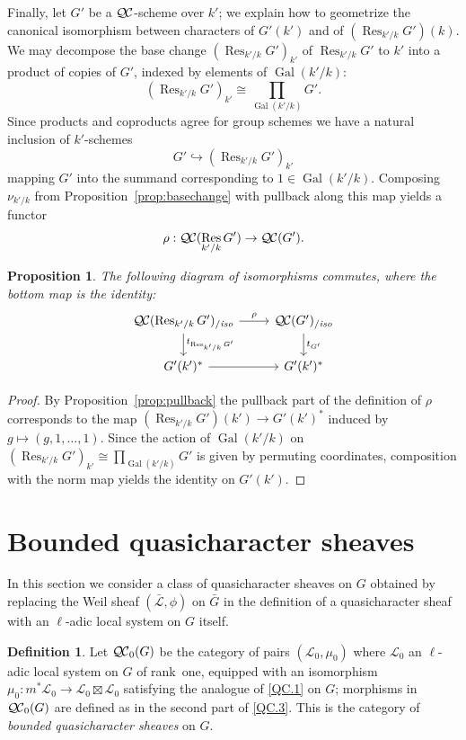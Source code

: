 \documentclass[11pt]{amsart}
\theoremstyle{plain}
\newtheorem{proposition}[theorem]{Proposition}
\theoremstyle{definition}
\newtheorem{definition}[theorem]{Definition}
\theoremstyle{remark}
\DeclareMathOperator{\Gal}{Gal}
\DeclareMathOperator{\Res}{Res}
\newcommand{\qcs}[1]{{\mathcal{#1}}}
\newcommand{\gqcs}[1]{{\mathcal{\bar #1}}}
\newcommand{\QC}{{\mathcal{Q\hskip-0.8pt C}}}
\newcommand{\QCb}{{\QC_0}}
\newcommand{\QCiso}[1]{\QC(#1)_{/\textit{iso}}}
\newcommand{\trFrob}[1]{t_{#1}}
\newcommand{\bG}{\bar{G}}
\begin{document}
Finally, let $G'$ be a $\QC$-scheme over $k'$;
we explain how to geometrize the canonical isomorphism between characters of $G'(k')$ and of $(\Res_{k'/k}G')(k)$.
We may decompose the base change $(\Res_{k'/k}G')_{k'}$ of $\Res_{k'/k}G'$ to $k'$
into a product of copies of $G'$, indexed by elements of $\Gal(k'/k)$:
\[
(\Res_{k'/k}G')_{k'} \cong \prod_{\Gal(k'/k)} G'.
\]
Since products and coproducts agree for group schemes we have a natural inclusion of $k'$-schemes 
\[
G' \hookrightarrow (\Res_{k'/k}G')_{k'}
\]
mapping $G'$ into the summand corresponding to $1 \in \Gal(k'/k)$.  Composing $\nu_{k'/k}$ 
from Proposition~\ref{prop:basechange} with pullback along this map yields a functor
\[
\rho : \QC(\Res_{k'/k}G') \to \QC(G').
\]

\begin{proposition}
The following diagram of isomorphisms commutes, where the bottom map is the identity:
\[
\begin{tikzcd}
\QCiso{\Res_{k'/k} G'} \dar{\trFrob{\Res_{k'/k} G'}} \rar{\rho} & \QCiso{G'} \dar{\trFrob{G'}}\\
G'(k')^* \rar & G'(k')^*
\end{tikzcd}
\]
\end{proposition}
\begin{proof}
By Proposition~\ref{prop:pullback} the pullback part of the definition of $\rho$ corresponds to the map $(\Res_{k'/k}G')(k') \to G'(k')^*$
induced by $g \mapsto (g, 1, \ldots, 1)$.  Since the action of $\Gal(k'/k)$ on $(\Res_{k'/k}G')_{k'} \cong \prod_{\Gal(k'/k)} G'$
is given by permuting coordinates, composition with the norm map yields the identity on $G'(k')$.
\end{proof}

\section{Bounded quasicharacter sheaves}\label{sec:bounded}

In this section we consider a class of quasicharacter sheaves on $G$ obtained by
replacing the Weil sheaf $(\gqcs{L}, \phi)$ on $\bG$ in the definition of a quasicharacter
sheaf with an $\ell$-adic local system on $G$ itself.

\begin{definition}
Let $\QCb(G)$ be the category of pairs $(\qcs{L}_0,\mu_0)$ 
where $\qcs{L}_0$ an $\ell$-adic local system on $G$ of rank~one, 
equipped with an isomorphism $\mu_0 : m^* \qcs{L}_0 \to \qcs{L}_0 \boxtimes \qcs{L}_0$ 
satisfying the analogue of \ref{QC.1} on $G$; 
morphisms in $\QCb(G)$ are defined as in the second part of 
\ref{QC.3}. 
This is the category of \emph{bounded quasicharacter sheaves} on $G$. 
\end{definition}
\end{document}

